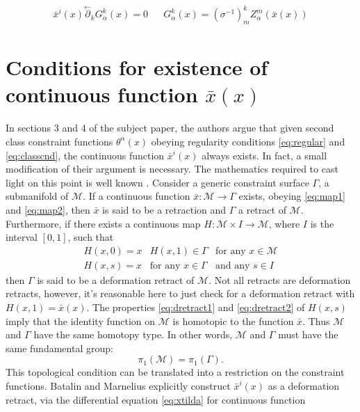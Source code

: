 \documentclass[a4paper,12pt]{article}
\theoremstyle{definition}
\theoremstyle{remark}
\numberwithin{equation}{section}
\newcommand{\al}{\alpha}
\newcommand{\si}{\sigma}
\newcommand{\M}{\mathcal{M}}
\newcommand{\bx}{\bar{x}}
\newcommand{\pl}{\overset{\leftarrow}{\partial}}
\begin{document}
\begin{eqnarray}\label{eq:gaugegen}
\bx^i(x) \pl_k G^k_{\al}(x)=0 && G^k_{\al}(x)=(\si^{-1})^k_m
Z^m_{\al}(\bx(x))
\end{eqnarray}




\section{Conditions for existence of continuous function $\bx(x)$}

In sections 3 and 4 of the subject paper\cite{Batalin:2001hs}, the
authors argue that given second class constraint functions
$\theta^{\al}(x)$ obeying regularity conditions \eqref{eq:regular}
and \eqref{eq:classcnd}, the continuous function $\bx^i(x)$ always
exists. In fact, a small modification of their argument is
necessary. The mathematics required to cast light on this point is
well known \cite{Nakahara:1990th}. Consider a generic constraint
surface $\Gamma$, a submanifold of $\M$. If a continuous function
$\bx: \M \rightarrow \Gamma$ exists, obeying \eqref{eq:map1} and
\eqref{eq:map2}, then $\bx$ is said to be a retraction and
$\Gamma$ a retract of $\M$. Furthermore, if there exists a
continuous map $H:\M\times I \rightarrow \M$, where $I$ is the
interval $[0,1]$, such that \begin{eqnarray}\label{eq:dretract1}
H(x,0)=x & H(x,1) \in \Gamma & \text{for any } x \in \M\\
H(x,s)=x & \text{for any } x \in \Gamma &\text{and any } s \in
I\label{eq:dretract2}
\end{eqnarray}
then $\Gamma$ is said to be a deformation retract of $\M$. Not all
retracts are deformation retracts, however, it's reasonable here
to just check for a deformation retract with $H(x,1)=\bx(x)$. The
properties \eqref{eq:dretract1} and \eqref{eq:dretract2} of
$H(x,s)$ imply that the identity function on $\M$ is homotopic to
the function $\bx$. Thus $\M$ and $\Gamma$ have the same homotopy
type. In other words, $\M$ and $\Gamma$ must have the same
fundamental group:
\begin{equation}\label{eq:fundgrp}
\pi_1(\M)=\pi_1(\Gamma).
\end{equation}
This topological condition can be translated into a restriction on
the constraint functions. Batalin and Marnelius explicitly
construct $\bx^i(x)$ as a deformation retract, via the
differential equation \eqref{eq:xtilda} for continuous function
\end{document}
